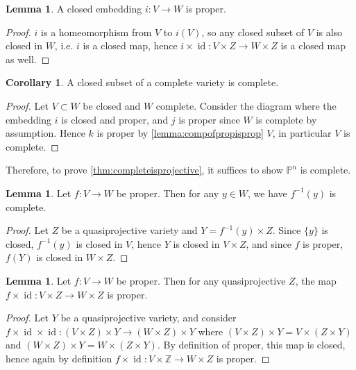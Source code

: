 \documentclass{article}
\newcommand{\Z}{\mathbb{Z}}
\newcommand{\p}{\mathbb{P}}
\newcommand{\id}{\operatorname{id}}
\theoremstyle{definition}
\newtheorem{lemma}[defn]{Lemma}
\newtheorem{coro}[defn]{Corollary}
\begin{document}
\begin{lemma}
\label{lemma:closedembisprop}
A closed embedding $i:V\rightarrow W$ is proper.
\end{lemma}
\begin{proof}
$i$ is a homeomorphism from $V$ to $i(V)$, so any closed subset of $V$ is also closed in $W$, i.e. $i$ is a closed map, hence $i\times\id:V\times Z\rightarrow W\times Z$ is a closed map as well.
\end{proof}

\begin{coro}
A closed subset of a complete variety is complete.
\end{coro}
\begin{proof}
Let $V\subset W$ be closed and $W$ complete. Consider the diagram  where the embedding $i$ is closed and proper, and $j$ is proper since $W$ is complete by assumption. Hence $k$ is proper by \ref{lemma:compofpropisprop} $V$, in particular $V$ is complete.
\end{proof}

Therefore, to prove \ref{thm:completeisprojective}, it suffices to show $\p^n$ is complete.

\begin{lemma}
Let $f:V\rightarrow W$ be proper. Then for any $y\in W$, we have $f^{-1}(y)$ is complete.
\end{lemma}
\begin{proof}
Let $Z$ be a quasiprojective variety and $Y=f^{-1}(y)\times Z$. Since $\{y\}$ is closed, $f^{-1}(y)$ is closed in $V$, hence $Y$ is closed in $V\times Z$, and since $f$ is proper, $f(Y)$ is closed in $W\times Z$.
\end{proof}

\begin{lemma}
Let $f:V\rightarrow W$ be proper. Then for any quasiprojective $Z$, the map $f\times\id:V\times Z\rightarrow W\times Z$ is proper.
\end{lemma}
\begin{proof}
Let $Y$ be a quasiprojective variety, and consider $f\times\id\times\id:(V\times Z)\times Y\rightarrow (W\times Z)\times Y$ where $(V\times Z)\times Y=V\times (Z\times Y)$ and $(W\times Z)\times Y=W\times (Z\times Y)$. By definition of proper, this map is closed, hence again by definition $f\times\id:V\times\Z\rightarrow W\times Z$ is proper.
\end{proof}
\end{document}
